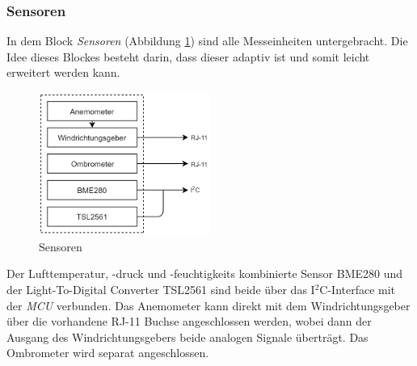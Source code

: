 \subsubsection{Sensoren}
In dem Block \textit{Sensoren} (Abbildung \ref{fig:sensoren}) sind alle Messeinheiten untergebracht. Die Idee dieses Blockes besteht darin, dass dieser adaptiv ist und somit leicht erweitert werden kann.\\

\begin{figure}[h]
	\centering
	\includegraphics[width=0.5\textwidth]{graphics/Konzeptdiagramme/Sensoren.PNG} 
	\caption{Sensoren}
	\label{fig:sensoren}
\end{figure}

Der Lufttemperatur, -druck und -feuchtigkeits kombinierte Sensor BME280 und der Light-To-Digital Converter TSL2561 sind beide über das I$^2$C-Interface mit der \textit{MCU} verbunden. Das Anemometer kann direkt mit dem Windrichtungsgeber über die vorhandene RJ-11 Buchse angeschlossen werden, wobei dann der Ausgang des Windrichtungsgebers beide analogen Signale überträgt. Das Ombrometer wird separat angeschlossen.\\
